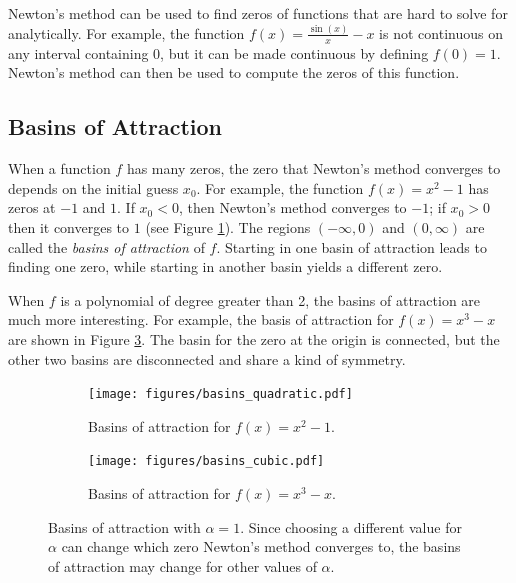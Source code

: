 \begin{info}
Newton's method can be used to find zeros of functions that are hard to solve for analytically.
For example, the function $f(x) = \frac{\sin(x)}{x}-x$ is not continuous on any interval containing 0, but it can be made continuous by defining $f(0)=1$.
Newton's method can then be used to compute the zeros of this function.
\end{info}
    

\subsection*{Basins of Attraction} %

When a function $f$ has many zeros, the zero that Newton's method converges to depends on the initial guess $x_0$.
For example, the function $f(x)=x^2-1$ has zeros at $-1$ and $1$.
If $x_0<0$, then Newton's method converges to $-1$; if $x_0 > 0$ then it converges to $1$ (see Figure \ref{fig:basins-quadratic}).
The regions $(-\infty, 0)$ and $(0, \infty)$ are called the \emph{basins of attraction} of $f$.
Starting in one basin of attraction leads to finding one zero, while starting in another basin yields a different zero.

When $f$ is a polynomial of degree greater than 2, the basins of attraction are much more interesting.
For example, the basis of attraction for $f(x) = x^3-x$ are shown in Figure \ref{fig:basins-cubic}.
The basin for the zero at the origin is connected, but the other two basins are disconnected and share a kind of symmetry.

\begin{figure}[H] %
\centering
\begin{subfigure}{.48\textwidth}
    \centering
    \texttt{[image: figures/basins\_quadratic.pdf]}
    \caption{Basins of attraction for $f(x) = x^2 -1$.}
    \label{fig:basins-quadratic}
\end{subfigure}
\quad
\begin{subfigure}{.48\textwidth}
    \centering
    \texttt{[image: figures/basins\_cubic.pdf]}
    \caption{Basins of attraction for $f(x) = x^3 -x$.}
    \label{fig:basins-cubic}
\end{subfigure}
\caption{Basins of attraction with $\alpha=1$.
Since choosing a different value for $\alpha$ can change which zero Newton's method converges to, the basins of attraction may change for other values of $\alpha$.}
\end{figure}

